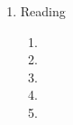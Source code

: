 \begin{enumerate}[label=Week \arabic*]
\begin{enumerate}[label=Day \arabic*]
		\item 
		\item 
		\item
		\item
		\item
	\end{enumerate}
	\item Reading
	\begin{enumerate}[label=Day \arabic*]
		\item 
		\item 
		\item
		\item
		\item
	\end{enumerate}
\end{enumerate}
